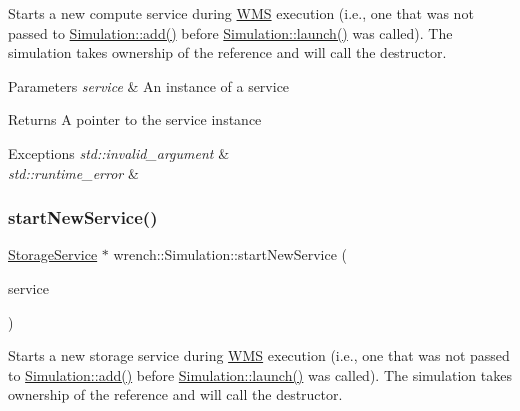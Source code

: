 Starts a new compute service during \hyperlink{classwrench_1_1_w_m_s}{W\+MS} execution (i.\+e., one that was not passed to \hyperlink{classwrench_1_1_simulation_ad1f5c12285ecfaf5a2ce7dab5ec8b4c5}{Simulation\+::add()} before \hyperlink{classwrench_1_1_simulation_ae9589632de9a2311ed1d7f7747478985}{Simulation\+::launch()} was called). The simulation takes ownership of the reference and will call the destructor. 


\begin{DoxyParams}{Parameters}
{\em service} & An instance of a service \\
\hline
\end{DoxyParams}
\begin{DoxyReturn}{Returns}
A pointer to the service instance
\end{DoxyReturn}

\begin{DoxyExceptions}{Exceptions}
{\em std\+::invalid\+\_\+argument} & \\
\hline
{\em std\+::runtime\+\_\+error} & \\
\hline
\end{DoxyExceptions}
\mbox{\label{classwrench_1_1_simulation_a9e862e02395fec3e153c85e58332f3d4}} 
\subsubsection{\texorpdfstring{start\+New\+Service()}{startNewService()}\hspace{0.1cm}{\footnotesize\ttfamily [2/4]}}
{\footnotesize\ttfamily \hyperlink{classwrench_1_1_storage_service}{Storage\+Service} $\ast$ wrench\+::\+Simulation\+::start\+New\+Service (\begin{DoxyParamCaption}\item[{\hyperlink{classwrench_1_1_storage_service}{Storage\+Service} $\ast$}]{service }\end{DoxyParamCaption})}



Starts a new storage service during \hyperlink{classwrench_1_1_w_m_s}{W\+MS} execution (i.\+e., one that was not passed to \hyperlink{classwrench_1_1_simulation_ad1f5c12285ecfaf5a2ce7dab5ec8b4c5}{Simulation\+::add()} before \hyperlink{classwrench_1_1_simulation_ae9589632de9a2311ed1d7f7747478985}{Simulation\+::launch()} was called). The simulation takes ownership of the reference and will call the destructor. 


